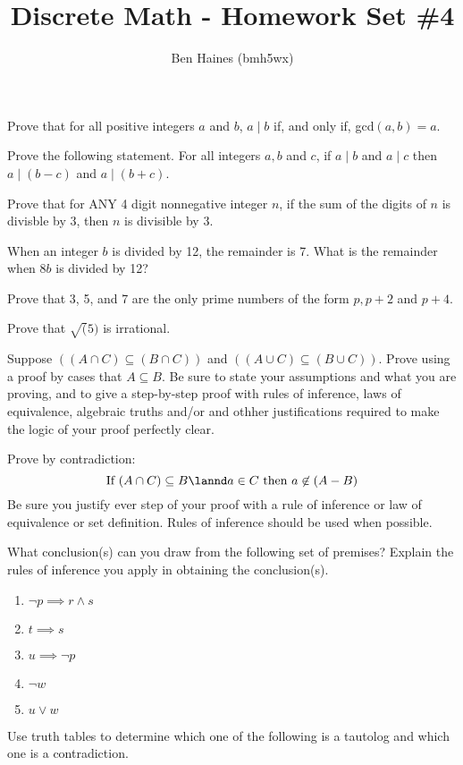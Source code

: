 \documentclass[paper=a4, fontsize=11pt]{jhwhw} %
\begin{document}
\title{Discrete Math - Homework Set \#4}
\author{Ben Haines (bmh5wx)}
\problem{}
Prove that for all positive integers $a$ and $b$, $a\mid b$ if, and only if, gcd$(a, b) = a$.
\solution

\problem{}
Prove the following statement. For all integers $a, b$ and $c$, if $a\mid b$ and $a\mid c$ then $a\mid (b-c)$ and $a\mid(b+c)$.
\solution

\problem{}
Prove that for ANY 4 digit nonnegative integer $n$, if the sum of the digits of $n$ is divisble by 3, then $n$ is divisible by 3.
\solution

\problem{}
When an integer $b$ is divided by 12, the remainder is 7. What is the remainder when $8b$ is divided by 12?
\solution

\problem{}
Prove that 3, 5, and 7 are the only prime numbers of the form $p, p+2$ and $p+4$. 
\solution

\problem{}
Prove that $\sqrt(5)$ is irrational.
\solution

\problem{}
Suppose $((A\cap C) \subseteq (B\cap C))$ and $((A\cup C) \subseteq (B\cup C))$. Prove using a proof by cases that $A\subseteq B$. Be sure to state your assumptions and what you are proving, and to give a step-by-step proof with rules of inference, laws of equivalence, algebraic truths and/or and othher justifications required to make the logic of your proof perfectly clear.

\problem{}
Prove by contradiction:
$$\text{If } (A\cap C) \subseteq B \lannd a\in C \text{ then } a\not\in (A - B)$$
Be sure you justify ever step of your proof with a rule of inference or law of equivalence or set definition. Rules of inference should be used when possible.
\solution

\problem{}
What conclusion(s) can you draw from the following set of premises? Explain the rules of inference you apply in obtaining the conclusion(s).
\begin{enumerate}
	\item $\neg p \implies r \land s$
	\item $t \implies s$
	\item $u \implies \neg p$
	\item $\neg w$
	\item $u \lor w$
\end{enumerate}
\solution



\problem{}
Use truth tables to determine which one of the following is a tautolog and which one is a contradiction. 
\solution
\end{document}
